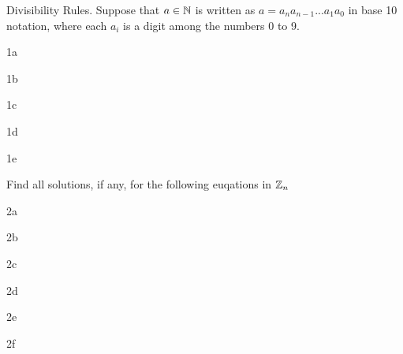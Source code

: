 \begin{question}{1}
Divisibility Rules. Suppose that $a \in \mathbb{N}$ is written as $a = a_na_{n-1}...a_1a_0$ in base 10 notation, where each $a_{i}$ is a digit among the numbers 0 to 9.
\end{question}


\begin{question}{1a}
\end{question}

\begin{question}{1b}
\end{question}

\begin{question}{1c}
\end{question}

\begin{question}{1d}
\end{question}

\begin{question}{1e}
\end{question}



\begin{question}{2}
Find all solutions, if any, for the following euqations in $\mathbb{Z}_n$
\end{question}


\begin{question}{2a}

\end{question}

\begin{question}{2b}

\end{question}

\begin{question}{2c}

\end{question}

\begin{question}{2d}

\end{question}

\begin{question}{2e}

\end{question}

\begin{question}{2f}

\end{question}

